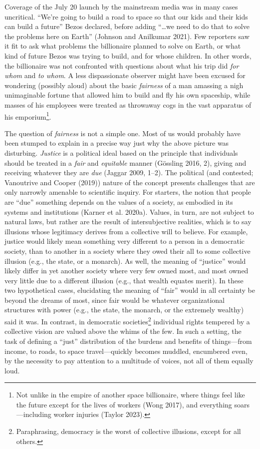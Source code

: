 \documentclass[12pt, oneside]{report}
\begin{document}
Coverage of the July 20 launch by the mainstream media was in many cases
uncritical. ``We're going to build a road to space so that our kids and
their kids can build a future'' Bezos declared, before adding
``\ldots we need to do that to solve the problems here on Earth''
(Johnson and Anilkumar 2021). Few reporters saw it fit to ask what
problems the billionaire planned to solve on Earth, or what kind of
future Bezos was trying to build, and for whose children. In other
words, the billionaire was not confronted with questions about what his
trip did \emph{for whom} and \emph{to whom}. A less dispassionate
observer might have been excused for wondering (possibly aloud) about
the basic \emph{fairness} of a man amassing a nigh unimaginable fortune
that allowed him to build and fly his own spaceship, while masses of his
employees were treated as throwaway cogs in the vast apparatus of his
emporium\footnote{Not unlike in the empire of another space billionaire,
  where things feel like the future except for the lives of workers
  (Wong 2017), and everything soars---including worker injuries (Taylor
  2023).}.

The question of \emph{fairness} is not a simple one. Most of us would
probably have been stumped to explain in a precise way just why the
above picture was disturbing. \emph{Justice} is a political ideal based
on the principle that individuals should be treated in a \emph{fair} and
\emph{equitable} manner (Gössling 2016, 2), giving and receiving
whatever they are \emph{due} (Jaggar 2009, 1--2). The political (and
contested; Vanoutrive and Cooper (2019)) nature of the concept presents
challenges that are only narrowly amenable to scientific inquiry. For
starters, the notion that people are ``due'' something depends on the
values of a society, as embodied in its systems and institutions (Karner
et al. 2020a). Values, in turn, are not subject to natural laws, but
rather are the result of intersubjective realities, which is to say
illusions whose legitimacy derives from a collective will to believe.
For example, justice would likely mean something very different to a
person in a democratic society, than to another in a society where they
owed their all to some collective illusion (e.g., the state, or a
monarch). As well, the meaning of ``justice'' would likely differ in yet
another society where very few owned most, and most owned very little
due to a different illusion (e.g., that wealth equates merit). In these
two hypothetical cases, elucidating the meaning of ``fair'' would in all
certainty be beyond the dreams of most, since fair would be whatever
organizational structures with power (e.g., the state, the monarch, or
the extremely wealthy) said it was. In contrast, in democratic
societies\footnote{Paraphrasing, democracy is the worst of collective
  illusions, except for all others.} individual rights tempered by a
collective vision are valued above the whims of the few. In such a
setting, the task of defining a ``just'' distribution of the burdens and
benefits of things---from income, to roads, to space travel---quickly
becomes muddled, encumbered even, by the necessity to pay attention to a
multitude of voices, not all of them equally loud.
\end{document}

